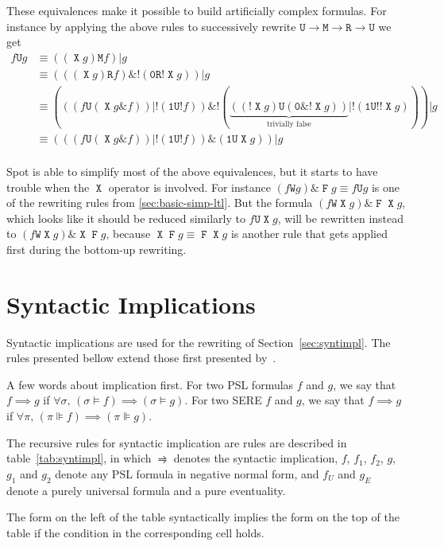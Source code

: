 \documentclass[a4paper,twoside,10pt,DIV=12]{scrreprt}
\DeclareMathOperator{\F}{\texttt{F}}
\newcommand{\U}{\mathbin{\texttt{U}}}
\newcommand{\R}{\mathbin{\texttt{R}}}
\DeclareMathOperator{\X}{\texttt{X}}
\newcommand{\M}{\mathbin{\texttt{M}}}
\newcommand{\W}{\mathbin{\texttt{W}}}
\DeclareMathOperator{\NOT}{\texttt{!}}
\newcommand{\OR}{\mathbin{\texttt{|}}}
\newcommand{\AND}{\mathbin{\texttt{\&}}}
\newcommand{\0}{\texttt{0}}
\newcommand{\1}{\texttt{1}}
\def\simp{\rightrightharpoons}
\begin{document}
These equivalences make it possible to build artificially complex
formulas.  For instance by applying the above rules to successively
rewrite $\U\to\M\to\R\to\U$ we get
\begin{align*}
f\U g &\equiv ((\X g)\M f)\OR g \\
      &\equiv (((\X g) \R f)\AND\NOT (\0\R\NOT \X g))\OR g \\
      &\equiv (((f \U (\X g\AND f))\OR\NOT(\1\U\NOT f)) \AND\NOT (\underbrace{((\NOT\X g) \U
(\0\AND \NOT\X g))}_{\text{trivially false}}\OR\NOT(\1\U\NOT\NOT\X g)))\OR g\\
      &\equiv (((f \U (\X g\AND f))\OR\NOT(\1\U\NOT f)) \AND(\1\U\X g))\OR g\\
\end{align*}

Spot is able to simplify most of the above equivalences, but it starts
to have trouble when the $\X$ operator is involved.  For instance $(f
\W g) \AND \F g \equiv f \U g$ is one of the rewriting rules from
\ref{sec:basic-simp-ltl}.  But the formula $(f \W \X g) \AND \F\X g$,
which looks like it should be reduced similarly to $f \U \X g$, will
be rewritten instead to $(f \W \X g) \AND \X\F g$, because $\X\F g
\equiv \F\X g$ is another rule that gets applied first during the
bottom-up rewriting.

\chapter{Syntactic Implications}\label{ann:syntimpl}

Syntactic implications are used for the rewriting of
Section~\ref{sec:syntimpl}.  The rules presented bellow extend those
first presented by~\citet{somenzi.00.cav}.

A few words about implication first.  For two PSL formulas $f$ and
$g$, we say that $f\implies g$ if $\forall\sigma,\,(\sigma\vDash
f)\implies(\sigma\vDash g)$.  For two SERE $f$ and
$g$, we say that $f\implies g$ if $\forall\pi,\,(\pi\VDash
f)\implies(\pi\VDash g)$.

The recursive rules for syntactic implication are rules are described
in table~\ref{tab:syntimpl}, in which $\simp$ denotes the syntactic
implication, $f$, $f_1$, $f_2$, $g$, $g_1$ and $g_2$ denote any PSL
formula in negative normal form, and $f_U$ and $g_E$ denote a
purely universal formula and a pure eventuality.

The form on the left of the table syntactically implies the form on
the top of the table if the condition in the corresponding cell holds.
\end{document}
